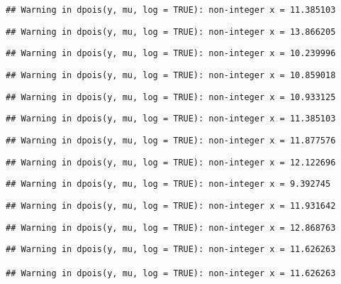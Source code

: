 \documentclass[
]{article}
\begin{document}
\begin{verbatim}
## Warning in dpois(y, mu, log = TRUE): non-integer x = 11.385103
\end{verbatim}

\begin{verbatim}
## Warning in dpois(y, mu, log = TRUE): non-integer x = 13.866205
\end{verbatim}

\begin{verbatim}
## Warning in dpois(y, mu, log = TRUE): non-integer x = 10.239996
\end{verbatim}

\begin{verbatim}
## Warning in dpois(y, mu, log = TRUE): non-integer x = 10.859018
\end{verbatim}

\begin{verbatim}
## Warning in dpois(y, mu, log = TRUE): non-integer x = 10.933125
\end{verbatim}

\begin{verbatim}
## Warning in dpois(y, mu, log = TRUE): non-integer x = 11.385103
\end{verbatim}

\begin{verbatim}
## Warning in dpois(y, mu, log = TRUE): non-integer x = 11.877576
\end{verbatim}

\begin{verbatim}
## Warning in dpois(y, mu, log = TRUE): non-integer x = 12.122696
\end{verbatim}

\begin{verbatim}
## Warning in dpois(y, mu, log = TRUE): non-integer x = 9.392745
\end{verbatim}

\begin{verbatim}
## Warning in dpois(y, mu, log = TRUE): non-integer x = 11.931642
\end{verbatim}

\begin{verbatim}
## Warning in dpois(y, mu, log = TRUE): non-integer x = 12.868763
\end{verbatim}

\begin{verbatim}
## Warning in dpois(y, mu, log = TRUE): non-integer x = 11.626263

## Warning in dpois(y, mu, log = TRUE): non-integer x = 11.626263
\end{verbatim}
\end{document}
